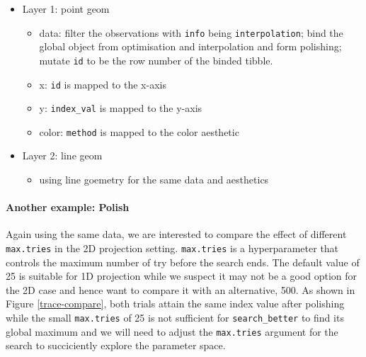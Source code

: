 \documentclass[12pt]{article}
\providecommand{\tightlist}{%
  \setlength{\itemsep}{0pt}\setlength{\parskip}{0pt}}
\begin{document}
\begin{itemize}
\tightlist
\item
  Layer 1: point geom

  \begin{itemize}
  \tightlist
  \item
    data: filter the observations with \texttt{info} being
    \texttt{interpolation}; bind the global object from optimisation and
    interpolation and form polishing; mutate \texttt{id} to be the row
    number of the binded tibble.
  \item
    x: \texttt{id} is mapped to the x-axis
  \item
    y: \texttt{index\_val} is mapped to the y-axis
  \item
    color: \texttt{method} is mapped to the color aesthetic
  \end{itemize}
\item
  Layer 2: line geom

  \begin{itemize}
  \tightlist
  \item
    using line goemetry for the same data and aesthetics
  \end{itemize}
\end{itemize}

\hypertarget{another-example-polish}{%
\paragraph{Another example: Polish}\label{another-example-polish}}

Again using the same data, we are interested to compare the effect of
different \texttt{max.tries} in the 2D projection setting.
\texttt{max.tries} is a hyperparameter that controls the maximum number
of try before the search ends. The default value of 25 is suitable for
1D projection while we suspect it may not be a good option for the 2D
case and hence want to compare it with an alternative, 500. As shown in
Figure \ref{trace-compare}, both trials attain the same index value
after polishing while the small \texttt{max.tries} of 25 is not
sufficient for \texttt{search\_better} to find its global maximum and we
will need to adjust the \texttt{max.tries} argument for the search to
succiciently explore the parameter space.
\end{document}
